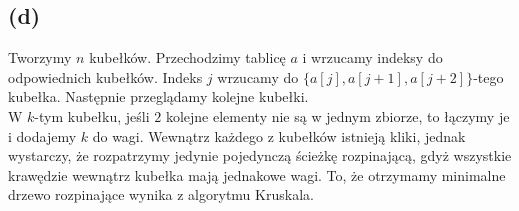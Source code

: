 \documentclass[12pt, a4paper]{article}
\begin{document}
\subsection*{(d)}
Tworzymy $n$ kubełków. Przechodzimy tablicę $a$ i wrzucamy indeksy do
odpowiednich kubełków. Indeks $j$ wrzucamy do $\{a[j],a[j+1],a[j+2]\}$-tego
kubełka. Następnie przeglądamy kolejne kubełki.\\
W $k$-tym kubełku, jeśli $2$ kolejne elementy nie są w jednym zbiorze, to
łączymy je i dodajemy $k$ do wagi. Wewnątrz każdego z kubełków istnieją kliki,
jednak wystarczy, że rozpatrzymy jedynie pojedynczą ścieżkę rozpinającą, gdyż
wszystkie krawędzie wewnątrz kubełka mają jednakowe wagi. To, że otrzymamy
minimalne drzewo rozpinające wynika z algorytmu Kruskala.
\end{document}
